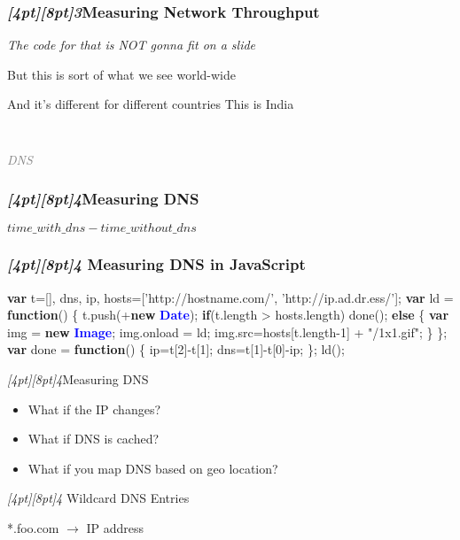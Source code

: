 \documentclass{beamer}
\newcommand{\sn}[1]{\textrm{\textit{\Huge{\raisebox{-3pt}[4pt][8pt]{\textcolor{f2elblue}{#1}}}}}\hspace{4pt}}
\newcommand{\innersplash}[1]{
  \begin{center}
    \large \textrm{\textit{ #1 } }
  \end{center}
}
\newcommand{\splashslide}[2][{}]{
  \begin{frame}
  \frametitle{#1}
  \innersplash{#2}
  \end{frame}
}
\newcommand{\leadinslide}[2]{
  \splashslide{
     {\fontsize{150}{20}\selectfont{\raisebox{0pt}[90pt][0pt]{\textcolor{light-gray}{#1}}}} \\ \huge \textcolor{gray}{#2}
  }
}
\def\green<#1>#2{\textcolor<#1>{dark-green}{\textbf<#1>{#2}}}
\def\blue<#1>#2{\textcolor<#1>{blue}{\textbf<#1>{#2}}}
\begin{document}
\splashslide[\sn{3}Measuring Network Throughput]{The code for that is NOT gonna fit on a slide}

\begin{frame}{But this is sort of what we see world-wide}
\end{frame}

\begin{frame}{And it's different for different countries}
\vspace{6em}
This is India
\end{frame}

\leadinslide{4}{DNS}

\splashslide[\sn{4}Measuring DNS]{ \( time\_with\_dns - time\_without\_dns \) }

\begin{frame}[fragile]
\frametitle{\sn{4} Measuring DNS in JavaScript}
\vspace{-.3cm}
\begin{semiverbatim}
\green<1>{var} t=[], dns, ip, hosts=['http://hostname.com/',
                          'http://ip.ad.dr.ess/'];
\green<1>{var} ld = \green<1>{function}() \{
   t.push(+\green<1>{new} \blue<1>{Date});
   \green<1>{if}(t.length > hosts.length) 
     done();
   \green<1>{else} \{
     \green<1>{var} img = \green<1>{new} \blue<1>{Image};
     img.onload = ld;
     img.src=hosts[t.length-1] + "/1x1.gif";
   \}
\};
\green<1>{var} done = \green<1>{function}() \{
  ip=t[2]-t[1];
  dns=t[1]-t[0]-ip;
\};
ld();
\end{semiverbatim}
\end{frame}

\begin{frame}{\sn{4}Measuring DNS}
\begin{itemize}
\item What if the IP changes?
\item What if DNS is cached?
\item What if you map DNS based on geo location?
\end{itemize}
\end{frame}

\begin{frame}{\sn{4} Wildcard DNS Entries}
  \begin{center}
     *.foo.com $ \rightarrow $ IP address
  \end{center}
\end{frame}
\end{document}

